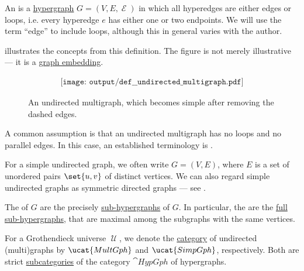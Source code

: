 \begin{definition}\label{def:undirected_multigraph}
  An  is a \hyperref[def:hypergraph]{hypergraph} \( G = (V, E, \mscrE) \) in which all hyperedges are either edges or loops, i.e. every hyperedge \( e \) has either one or two endpoints. We will use the term \enquote{edge} to include loops, although this in general varies with the author.

   illustrates the concepts from this definition. The figure is not merely illustrative --- it is a \hyperref[def:quiver_geometric_realization/embedding]{graph embedding}.

  \begin{figure}[h]
    \begin{equation}\label{eq:fig:def:undirected_multigraph}
      \begin{aligned}
        \texttt{[image: output/def\_\_undirected\_multigraph.pdf]}
      \end{aligned}
    \end{equation}
    \caption{An undirected multigraph, which becomes simple after removing the dashed edges.}\label{fig:def:undirected_multigraph}
  \end{figure}

  \begin{thmenum}
     A common assumption is that an undirected multigraph has no loops and no parallel edges. In this case, an established terminology is .

    For a simple undirected graph, we often write \( G = (V, E) \), where \( E \) is a set of unordered pairs \( \set{ u, v } \) of distinct vertices. We can also regard simple undirected graphs as symmetric directed graphs --- see .

     The  of \( G \) are the precisely \hyperref[def:hypergraph/submodel]{sub-hypergraphs} of \( G \). In particular, the  are the \hyperref[eq:def:hypergraph/submodel/full]{full sub-hypergraphs}, that are maximal among the subgraphs with the same vertices.

     For a Grothendieck universe \( \mscrU \), we denote the \hyperref[def:category]{category} of undirected (multi)graphs by \( \ucat{MultGph} \) and \( \ucat{SimpGph} \), respectively. Both are strict \hyperref[def:subcategory]{subcategories} of the category \hyperref[def:category_of_small_hypergraphs]{\( \cat{HypGph} \)} of hypergraphs.
  \end{thmenum}
\end{definition}

